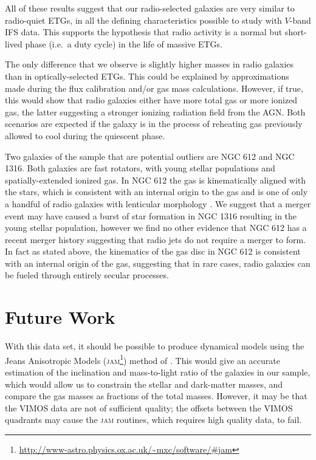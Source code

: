 All of these results suggest that our radio-selected galaxies are very similar to radio-quiet ETGs, in all the defining characteristics possible to study with $V$-band IFS data. This supports the hypothesis that radio activity is a normal but short-lived phase (i.e.\ a duty cycle) in the life of massive ETGs. 

The only difference that we observe is slightly higher  masses in radio galaxies than in optically-selected ETGs. This could be explained by approximations made during the flux calibration and/or gas mass calculations. However, if true, this would show that radio galaxies either have more total gas or more ionized gas, the latter suggesting a stronger ionizing radiation field from the AGN. Both scenarios are expected if the galaxy is in the process of reheating gas previously allowed to cool during the quiescent phase. 

Two galaxies of the sample that are potential outliers are NGC 612 and NGC 1316. Both galaxies are fast rotators, with young stellar populations and spatially-extended ionized gas. In NGC 612 the gas is kinematically aligned with the stars, which is consistent with an internal origin to the gas and is one of only a handful of radio galaxies with lenticular morphology \citep[e.g.][]{Heckman1982, Ledlow1998, Morganti2011}. We suggest that a merger event may have caused a burst of star formation in NGC 1316 resulting in the young stellar population, however we find no other evidence that NGC 612 has a recent merger history suggesting that radio jets do not require a merger to form. In fact as stated above, the kinematics of the gas disc in NGC 612 is consistent with an internal origin of the gas, suggesting that in rare cases, radio galaxies can be fueled through entirely secular processes. 


\section{Future Work}
	\label{sec:future}
	With this data set, it should be possible to produce dynamical models using the Jeans Anisotropic Models (\textsc{jam}\footnote{\url{http://www-astro.physics.ox.ac.uk/~mxc/software/\#jam}}) method of \citet{Cappellari2008}. This would give an accurate estimation of the inclination and mass-to-light ratio of the galaxies in our sample, which would allow us to constrain the stellar and dark-matter masses, and compare the gas masses as fractions of the total masses. However, it may be that the VIMOS data are not of sufficient quality; the offsets between the VIMOS quadrants may cause the \textsc{jam} routines, which requires high quality data, to fail. 

